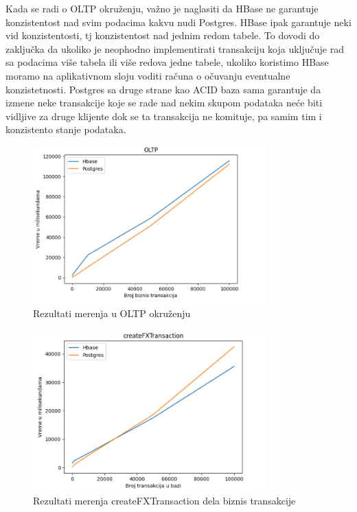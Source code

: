 \documentclass[12pt,oneside]{memoir}
\begin{document}
Kada se radi o OLTP okruženju, važno je naglasiti da HBase ne garantuje konzistentost nad svim podacima kakvu nudi Postgres. HBase ipak garantuje neki vid konzistentosti, tj konzistentost nad jednim redom tabele. To dovodi do zaključka da ukoliko je neophodno implementirati transakciju koja uključuje rad sa podacima više tabela ili više redova jedne tabele, ukoliko koristimo HBase moramo na aplikativnom sloju voditi računa o očuvanju  eventualne konzistetnosti. Postgres sa druge strane kao ACID baza sama garantuje da izmene neke transakcije koje se rade nad nekim skupom podataka neće biti vidljive za druge klijente dok se ta transakcija ne komituje, pa samim tim i konzistento stanje podataka.

\begin{figure}[!ht]
  \centering
  \includegraphics[width=0.8\textwidth]{oltp-vizualization.png}
  \caption{Rezultati merenja u OLTP okruženju}
  \label{fig:grafikon}
\end{figure}

\begin{figure}[!ht]
  \centering
  \includegraphics[width=0.8\textwidth]{createFxTransaction-vizualization.png}
  \caption{Rezultati merenja createFXTransaction dela biznis transakcije}
  \label{fig:grafikon}
\end{figure}
\end{document}
